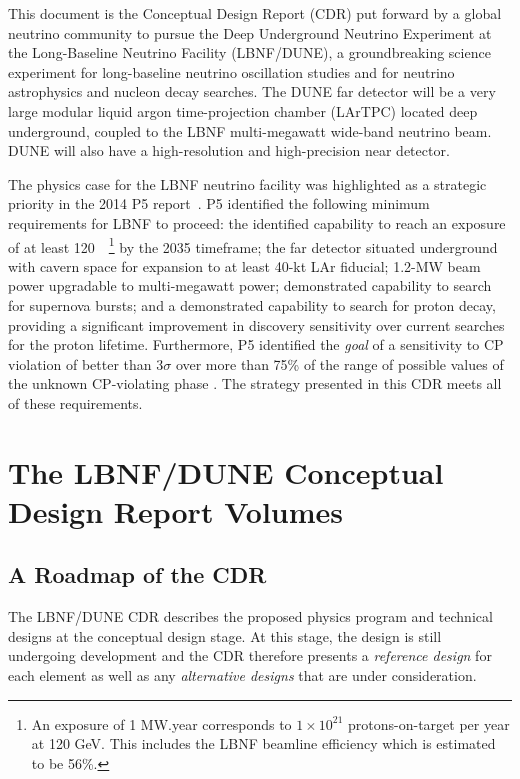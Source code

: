 This document is %
the Conceptual Design Report (CDR) put forward by a global neutrino community to pursue 
the Deep Underground Neutrino Experiment at the Long-Baseline Neutrino Facility (LBNF/DUNE),
a groundbreaking science experiment for long-baseline neutrino oscillation studies and for neutrino astrophysics and nucleon decay searches. The DUNE far detector will be a very large modular liquid argon time-projection chamber (LArTPC) located deep underground, coupled to the LBNF multi-megawatt  %
wide-band neutrino beam.   DUNE will also have a high-resolution and high-precision near detector.

The physics case for the LBNF neutrino facility was highlighted as a strategic priority in the 2014 P5 report~\cite{p5report2014}.
P5 identified the following minimum requirements for LBNF to proceed: 
the identified capability to reach an exposure of at least 120~\ktMWyr{}~\footnote{An exposure
of 1 MW.year corresponds to $1\times 10^{21}$ protons-on-target per year at 120 GeV. This includes the LBNF beamline efficiency which is estimated to be 56\%.}  by the 2035 timeframe;
the far detector situated underground with cavern space for expansion to at least 40-kt LAr fiducial;
1.2-MW beam power upgradable to multi-megawatt power;
demonstrated capability to search for supernova bursts; and
a demonstrated capability to search for proton decay, 
providing a significant improvement in discovery sensitivity over current searches for the proton lifetime.
Furthermore, P5 identified  the \textit{goal} of a sensitivity to CP violation of better than 3$\sigma$ over more than 75\% 
of the range of possible values of the unknown CP-violating phase \deltacp.
The strategy presented in this CDR meets all of these requirements.

\section{The LBNF/DUNE Conceptual Design Report Volumes}

\subsection{A Roadmap of the CDR}

The LBNF/DUNE CDR describes the proposed physics program and 
technical designs at the conceptual design stage.  At this stage, the design is
still undergoing development and the CDR therefore presents a \textit{reference design} for each element as well as any 
\textit{alternative designs} that are under consideration.

